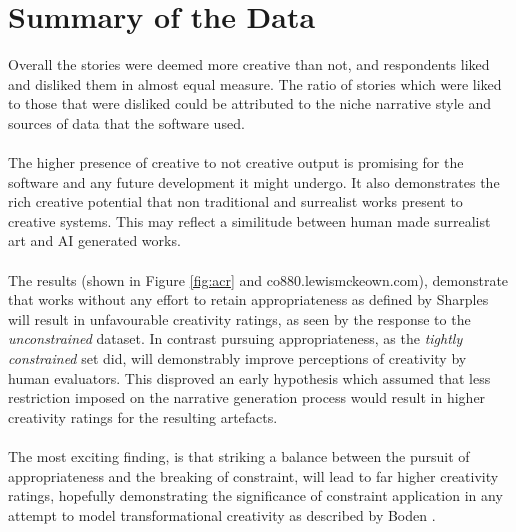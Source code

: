 \documentclass[letterpaper]{article}
\begin{document}
\section{Summary of the Data}
Overall the stories were deemed more creative than not, and respondents liked and disliked them in almost equal measure. The ratio of stories which were liked to those that were disliked could be attributed to the niche narrative style and sources of data that the software used.\\
\\The higher presence of creative to not creative output is promising for the software and any future development it might undergo. It also demonstrates the rich creative potential that non traditional and surrealist works present to creative systems. This may reflect a similitude between human made surrealist art and AI generated works.\\ 
\\The results (shown in Figure \ref{fig:acr} and co880.lewismckeown.com), demonstrate that works without any effort to retain appropriateness as defined by Sharples \cite{Sharples96anaccount} will result in unfavourable creativity ratings, as seen by the response to the \emph{unconstrained} dataset. In contrast pursuing appropriateness, as the \emph{tightly constrained} set did, will demonstrably improve perceptions of creativity by human evaluators. This disproved an early hypothesis which assumed that less restriction imposed on the narrative generation process would result in higher creativity ratings for the resulting artefacts.\\ 
\\The most exciting finding, is that striking a balance between the pursuit of appropriateness and the breaking of constraint, will lead to far higher creativity ratings, hopefully demonstrating the significance of constraint application in any attempt to model transformational creativity as described by Boden \cite{BODEN1998347}.
\end{document}
